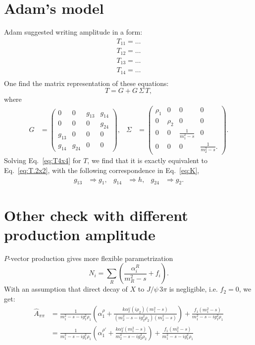 \documentclass[aps,prd,superscriptaddress,onecolumn,nofootinbib,preprintnumbers,notitlepage]{revtex4-1}
\begin{document}
\section{Adam's model}
Adam suggested writing amplitude in a form:
\begin{align*}
  T_{11} = \dots\\
  T_{12} = \dots\\
  T_{13} = \dots\\
  T_{14} = \dots\\
\end{align*}
One find the matrix representation of these equations:
\begin{equation} \label{eq:T4x4}
  T = G + G\,\Sigma\,T,
\end{equation}
where
\begin{align}
  G &=
  \begin{pmatrix}0 & 0 & g_{13} & g_{14}\\0 & 0 & 0 & g_{24}\\g_{13} & 0 & 0 & 0\\g_{14} & g_{24} & 0 & 0\end{pmatrix},&
  \Sigma &=
  \begin{pmatrix}
    \rho_1 & 0 & 0 & 0\\
     0 & \rho_2 & 0 & 0\\
     0 & 0 & \frac{1}{m_1^2-s} & 0\\
     0 & 0 & 0 & \frac{1}{m_2^2-s}.
  \end{pmatrix}.
\end{align}
Solving Eq.~\eqref{eq:T4x4} for $T$, we find that it is exactly equivalent to Eq.~\eqref{eq:T.2x2},
with the following correspondence in Eq.~\eqref{eq:K},
\begin{align}
  g_{13} &\Rightarrow g_1,&
  g_{14} &\Rightarrow h,&
  g_{24} &\Rightarrow g_2.
\end{align}

\section{Other check with different production amplitude}
$P$-vector production gives more flexible parametrization
\begin{equation}
  N_i = \sum_R \left( \frac{\alpha_i^R}{m_R^2-s} + f_i \right).
\end{equation}
With an assumption that direct decay of $X$ to $J/\psi\,3\pi$ is negligible, i.e. $f_2 = 0$, we get:
\begin{align}
  \hat{A}_{\pi\pi} &=
    \frac{1}{m_1^2-s-ig_1^2\rho_1} \left(
    \alpha_1^{\rho} + \frac{k \alpha_2^\omega (i\rho_2) (m_1^2-s)}{(m_2^2-s-ig_2^2\rho_2)(m_2^2-s)}
  \right)  + \frac{f_1(m_1^2-s)}{m_1^2-s-ig_1^2\rho_1}\\\nonumber
  &=
    \frac{1}{m_1^2-s-ig_1^2\rho_1} \left(
    \alpha_1^{\rho\prime} + \frac{k \alpha_2^\omega (m_1^2-s)}{m_2^2-s-ig_2^2\rho_2}
  \right)  + \frac{f_1(m_1^2-s)}{m_1^2-s-ig_1^2\rho_1}
\end{align}
\end{document}
